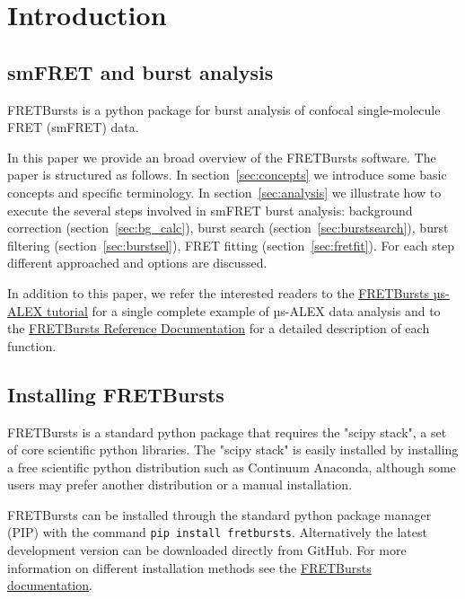 \section{Introduction}

\subsection{smFRET and burst analysis}

FRETBursts is a python package for burst analysis of confocal single-molecule
FRET (smFRET) data.

In this paper we provide an broad overview of the FRETBursts software. The 
paper is structured as follows. In section~\ref{sec:concepts} we
introduce some basic concepts and specific terminology.
In section~\ref{sec:analysis} we illustrate how to execute the several steps involved
in smFRET burst analysis: background correction (section~\ref{sec:bg_calc}), burst search
(section~\ref{sec:burstsearch}), burst filtering (section~\ref{sec:burstsel}), 
FRET fitting (section~\ref{sec:fretfit}). For each step different approached and options 
are discussed.

In addition to this paper, we refer the interested readers to the 
\href{http://nbviewer.ipython.org/github/tritemio/FRETBursts_notebooks/blob/master/notebooks/FRETBursts\%20-\%20us-ALEX\%20smFRET\%20burst\%20analysis.ipynb}{FRETBursts µs-ALEX tutorial} 
for a single complete example of µs-ALEX data analysis and to the
\href{http://fretbursts.readthedocs.org/}{FRETBursts Reference Documentation}
for a detailed description of each function.

\subsection{Installing FRETBursts}
FRETBursts is a standard python package that requires the "scipy stack", a set
of core scientific python libraries.
The "scipy stack" is easily installed by installing a free scientific python
distribution such as Continuum Anaconda, although some users may prefer another
distribution or a manual installation.

FRETBursts can be installed through the standard python package manager (PIP)
with the command \texttt{pip install fretbursts}. 
Alternatively the latest development version can be downloaded directly 
from GitHub. For more information on different installation methods see the
\href{http://fretbursts.readthedocs.org/en/latest/installation.html}{FRETBursts
documentation}.

